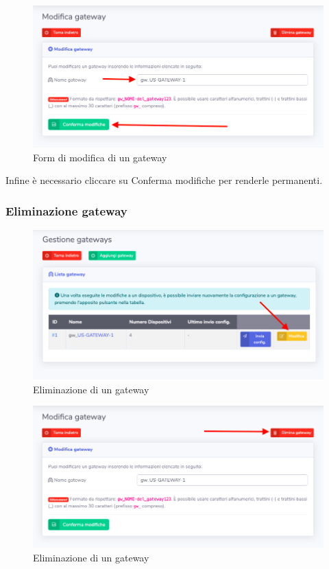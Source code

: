 		\begin{figure}[H]
		\centering
		\includegraphics[scale=0.600]{res/images/admin/modGateway.png}
		\caption{Form di modifica di un gateway}
	\end{figure}

		Infine è necessario cliccare su Conferma modifiche per renderle permanenti.

	\subsubsection{Eliminazione gateway}

		\begin{figure}[H]
		\centering
		\includegraphics[scale=0.600]{res/images/admin/selModGateway.png}
		\caption{Eliminazione di un gateway}
	\end{figure}

		\begin{figure}[H]
		\centering
		\includegraphics[scale=0.600]{res/images/admin/elimGateway.png}
		\caption{Eliminazione di un gateway}
	\end{figure}


